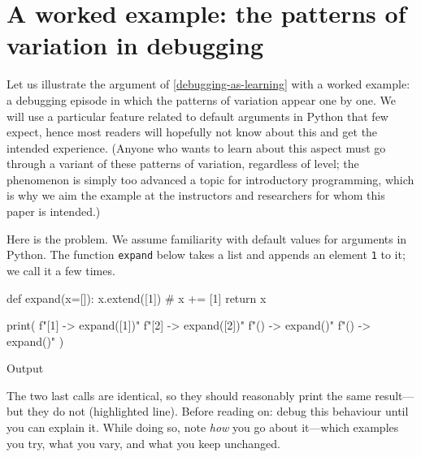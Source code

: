 \mode*
{}

\section{A worked example: the patterns of variation in debugging}
\label{debugging}

Let us illustrate the argument of \cref{debugging-as-learning} with a worked
example: a debugging episode in which the patterns of variation appear one by
one.
We will use a particular feature related to default arguments in Python that
few expect, hence most readers will hopefully not know about this and get the
intended experience.
(Anyone who wants to learn about this aspect must go through a variant of
these patterns of variation, regardless of level; the phenomenon is simply
too advanced a topic for introductory programming, which is why we aim the
example at the instructors and researchers for whom this paper is intended.)

Here is the problem.
We assume familiarity with default values for arguments in Python.
The function \texttt{expand} below takes a list and appends an
element \texttt{1} to it; we call it a few times.

\begin{frame}[fragile]
  \begin{pyblock}[tryfirst]
def expand(x=[]):
  x.extend([1]) # x += [1]
  return x

print(
  f"[1] -> {expand([1])}\n"
  f"[2] -> {expand([2])}\n"
  f"()  -> {expand()}\n"
  f"()  -> {expand()}\n"
)
  \end{pyblock}
  \begin{block}{Output}\printpythontex[verbatim][highlightlines={4}]\end{block}

  \begin{exercise}\label{ex:tryfirst}
    The two last calls are identical, so they should reasonably print the
    same result---but they do not (highlighted line).
    Before reading on: debug this behaviour until you can explain it.
    While doing so, note \emph{how} you go about it---which examples you
    try, what you vary, and what you keep unchanged.
  \end{exercise}
\end{frame}

